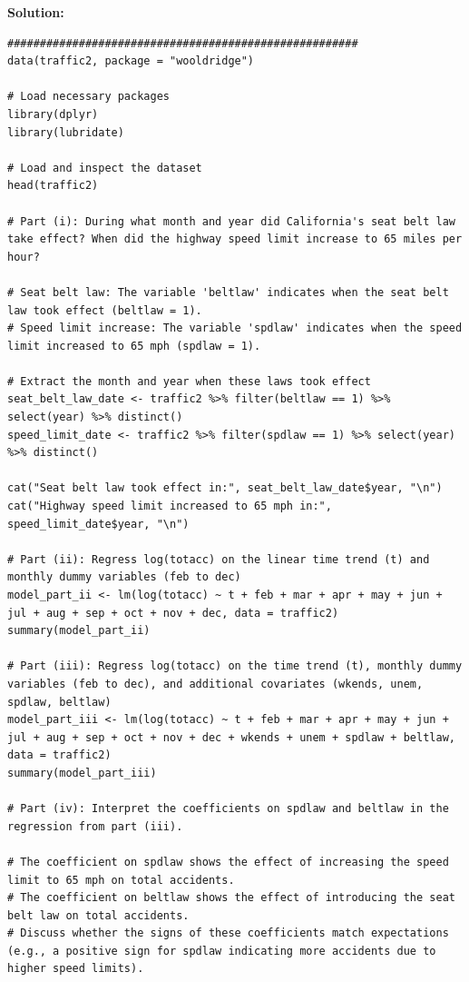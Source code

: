 \documentclass[12pt]{article}
\begin{document}
\begin{enumerate}
\begin{enumerate}
\end{enumerate}


{\color{blue}
\noindent \textbf{Solution:}

\begin{lstlisting}
######################################################
data(traffic2, package = "wooldridge")

# Load necessary packages
library(dplyr)
library(lubridate)

# Load and inspect the dataset
head(traffic2)

# Part (i): During what month and year did California's seat belt law take effect? When did the highway speed limit increase to 65 miles per hour?

# Seat belt law: The variable 'beltlaw' indicates when the seat belt law took effect (beltlaw = 1).
# Speed limit increase: The variable 'spdlaw' indicates when the speed limit increased to 65 mph (spdlaw = 1).

# Extract the month and year when these laws took effect
seat_belt_law_date <- traffic2 %>% filter(beltlaw == 1) %>% select(year) %>% distinct()
speed_limit_date <- traffic2 %>% filter(spdlaw == 1) %>% select(year) %>% distinct()

cat("Seat belt law took effect in:", seat_belt_law_date$year, "\n")
cat("Highway speed limit increased to 65 mph in:", speed_limit_date$year, "\n")

# Part (ii): Regress log(totacc) on the linear time trend (t) and monthly dummy variables (feb to dec)
model_part_ii <- lm(log(totacc) ~ t + feb + mar + apr + may + jun + jul + aug + sep + oct + nov + dec, data = traffic2)
summary(model_part_ii)

# Part (iii): Regress log(totacc) on the time trend (t), monthly dummy variables (feb to dec), and additional covariates (wkends, unem, spdlaw, beltlaw)
model_part_iii <- lm(log(totacc) ~ t + feb + mar + apr + may + jun + jul + aug + sep + oct + nov + dec + wkends + unem + spdlaw + beltlaw, data = traffic2)
summary(model_part_iii)

# Part (iv): Interpret the coefficients on spdlaw and beltlaw in the regression from part (iii).

# The coefficient on spdlaw shows the effect of increasing the speed limit to 65 mph on total accidents.
# The coefficient on beltlaw shows the effect of introducing the seat belt law on total accidents.
# Discuss whether the signs of these coefficients match expectations (e.g., a positive sign for spdlaw indicating more accidents due to higher speed limits).


\end{lstlisting}}
\end{enumerate}
\end{document}
